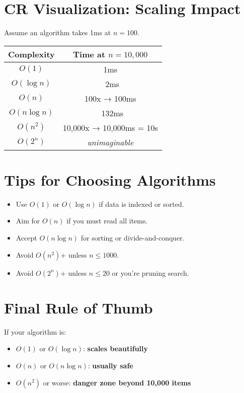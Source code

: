 \documentclass{article}
\begin{document}
\section*{ CR Visualization: Scaling Impact}

Assume an algorithm takes 1ms at \( n = 100 \).

\begin{tabular}{|c|c|}
\hline
\textbf{Complexity} & \textbf{Time at \( n = 10,000 \)} \\
\hline
\( O(1) \)           & 1ms \\
\( O(\log n) \)      & ~2ms \\
\( O(n) \)           & 100x → 100ms \\
\( O(n \log n) \)    & ~132ms \\
\( O(n^2) \)         & 10,000x → 10,000ms = 10s \\
\( O(2^n) \)         & \textit{unimaginable} \\
\hline
\end{tabular}

\section*{Tips for Choosing Algorithms}

\begin{itemize}
    \item Use \( O(1) \) or \( O(\log n) \) if data is indexed or sorted.
    \item Aim for \( O(n) \) if you must read all items.
    \item Accept \( O(n \log n) \) for sorting or divide-and-conquer.
    \item Avoid \( O(n^2) \)+ unless \( n \leq 1000 \).
    \item Avoid \( O(2^n) \)+ unless \( n \leq 20 \) or you're pruning search.
\end{itemize}

\section*{Final Rule of Thumb}

If your algorithm is:

\begin{itemize}
    \item \( O(1) \) or \( O(\log n) \): \textbf{scales beautifully}
    \item \( O(n) \) or \( O(n \log n) \): \textbf{usually safe}
    \item \( O(n^2) \) or worse: \textbf{danger zone beyond 10,000 items}
\end{itemize}
\end{document}
